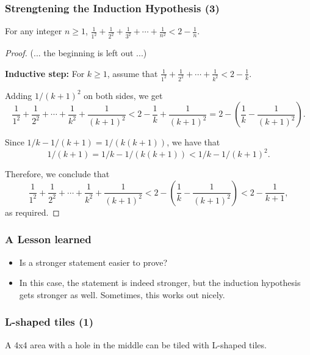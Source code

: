 \begin{frame}\frametitle{Strengtening the Induction Hypothesis (3)}
  \begin{theorem}
    For any integer $n\geq 1$, $\frac{1}{1^2} + \frac{1}{2^2} + \frac{1}{3^2} + \cdots +\frac{1}{n^2} < 2 - \frac{1}{n}$.
  \end{theorem}
  \pause
  \begin{proof}
    {\footnotesize
      (... the beginning is left out ...)
      
      {\bf Inductive step:} For $k\geq 1$, assume that $ \frac{1}{1^2} + \frac{1}{2^2}  + \cdots +\frac{1}{k^2} < 2 - \frac{1}{k}. $
      
      Adding $1/(k+1)^2$ on both sides, we get
      \[ \frac{1}{1^2} + \frac{1}{2^2}  + \cdots +\frac{1}{k^2}+\frac{1}{(k+1)^2}
      < 2 - \frac{1}{k} +\frac{1}{(k+1)^2}
      = 2 - \left(\frac{1}{k} - \frac{1}{(k+1)^2}\right).\]

     Since $1/k - 1/(k+1) = 1/(k(k+1))$, we have that
      \[1/(k+1) = 1/k - 1/(k(k+1)) < 1/k - 1/(k+1)^2.\]

      Therefore, we conclude that
      \[
      \frac{1}{1^2} + \frac{1}{2^2} + \cdots +\frac{1}{k^2}+\frac{1}{(k+1)^2}
      < 2 - \left(\frac{1}{k} - \frac{1}{(k+1)^2}\right)
      < 2 - \frac{1}{k+1},
      \]
      as required.
    }
  \end{proof}
\end{frame}

\begin{frame}\frametitle{A Lesson learned}
  \begin{itemize}
  \item
    Is a stronger statement easier to prove?
    \pause
  \item
    In this case, the statement is indeed stronger, but the induction
    hypothesis gets stronger as well.  Sometimes, this works out
    nicely.
  \end{itemize}
\end{frame}

\begin{frame}\frametitle{L-shaped tiles (1)}
  A 4x4 area with a hole in the middle can be tiled with L-shaped tiles.

  \vspace{0.2in}
  
\end{frame}

